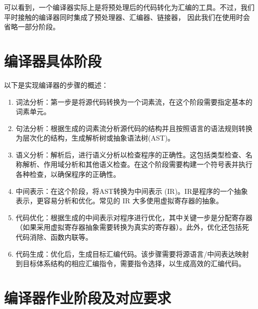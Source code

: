 可以看到，一个编译器实际上是将预处理后的代码转化为汇编的工具。不过，我们平时接触的编译器同时集成了预处理器、汇编器、链接器，
因此我们在使用时会省略一部分阶段。

\section{编译器具体阶段}

以下是实现编译器的步骤的概述：

\begin{enumerate}
    \item 词法分析：第一步是将源代码转换为一个词素流，在这个阶段需要指定基本的词素单元。
    \item 句法分析：根据生成的词素流分析源代码的结构并且按照语言的语法规则转换为层次化的结构，生成解析树或抽象语法树(AST)。
    \item 语义分析：解析后，进行语义分析以检查程序的正确性。这包括类型检查、名称解析、作用域分析和其他语义检查。在这个阶段需要构建一个符号表并执行各种检查，以确保程序的正确性。
    \item 中间表示：在这个阶段，将AST转换为中间表示 (IR)。IR是程序的一个抽象表示，更容易分析和优化。常见的 IR 大多使用虚拟寄存器的抽象。
    \item 代码优化：根据生成的中间表示对程序进行优化，其中关键一步是分配寄存器（如果采用虚拟寄存器抽象需要转换为真实的寄存器）。此外，优化还包括死代码消除、函数内联等。
    \item 代码生成：优化后，生成目标汇编代码。该步骤需要将源语言/中间表达映射到目标体系结构的相应汇编指令，需要指令选择，以生成高效的汇编代码。
\end{enumerate}

\section{编译器作业阶段及对应要求}


